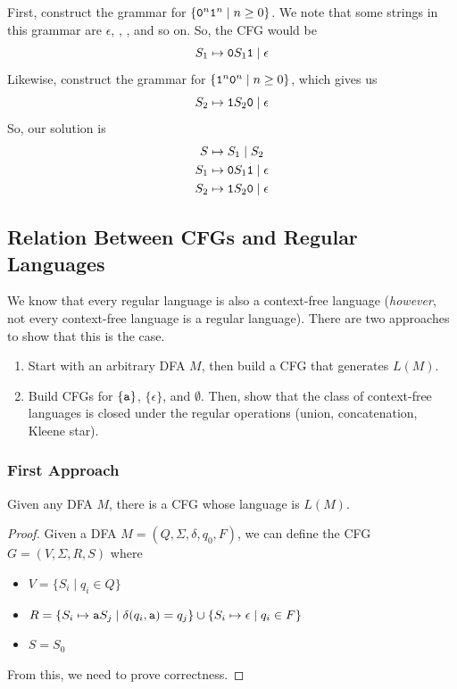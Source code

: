 \documentclass[letterpaper]{article}
\begin{document}
\begin{mdframed}[]
    First, construct the grammar for $\{\texttt{0}^n \texttt{1}^n \mid n \geq 0\}$. We note that some strings in this grammar are $\epsilon$, , , and so on. So, the CFG would be  
    \[S_1 \mapsto \texttt{0}S_1 \texttt{1} \mid \epsilon\]
    Likewise, construct the grammar for $\{\texttt{1}^n \texttt{0}^n \mid n \geq 0\}$, which gives us 
    \[S_2 \mapsto \texttt{1}S_2 \texttt{0} \mid \epsilon\]
    So, our solution is 
    \begin{equation*}
        \begin{aligned}
            S &\mapsto S_1 \mid S_2 \\ 
            S_1 &\mapsto \texttt{0}S_1 \texttt{1} \mid \epsilon \\ 
            S_2 &\mapsto \texttt{1}S_2 \texttt{0} \mid \epsilon
        \end{aligned}
    \end{equation*}
\end{mdframed}


\subsection{Relation Between CFGs and Regular Languages}
We know that every regular language is also a context-free language (\emph{however}, not every context-free language is a regular language). There are two approaches to show that this is the case.
\begin{enumerate}
    \item Start with an arbitrary DFA $M$, then build a CFG that generates $L(M)$. 
    \item Build CFGs for $\{\texttt{a}\}$, $\{\epsilon\}$, and $\emptyset$. Then, show that the class of context-free languages is closed under the regular operations (union, concatenation, Kleene star). 
\end{enumerate}

\subsubsection{First Approach}
\begin{proposition}
    Given any DFA $M$, there is a CFG whose language is $L(M)$. 
\end{proposition}

\begin{mdframed}[nobreak=true]
    \begin{proof}
        Given a DFA $M = (Q, \Sigma, \delta, q_0, F)$, we can define the CFG $G = (V, \Sigma, R, S)$ where 
        \begin{itemize}
            \item $V = \{S_i \mid q_i \in Q\}$
            \item $R = \{S_i \mapsto \texttt{a}S_j \mid \delta(q_i, \texttt{a}) = q_j\} \cup \{S_i \mapsto \epsilon \mid q_i \in F\}$
            \item $S = S_0$
        \end{itemize}
        From this, we need to prove correctness.
    \end{proof}
\end{mdframed}
\end{document}
